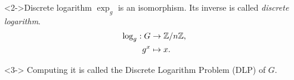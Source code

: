 \documentclass[10pt,usepdftitle=false]{beamer}
\begin{document}
\begin{frame}
\begin{columns}
\begin{column}{0.6\textwidth}
      \begin{block}<2->{Discrete logarithm} $\exp_g$ is an
        isomorphism. Its inverse is called \emph{discrete logarithm}.
        \begin{align*}
          \log_g : G &\rightarrow \mathbb{Z}/n\mathbb{Z}\text{,}\\
          g^x&\mapsto x\text{.}
        \end{align*}

        \begin{uncoverenv}<3-> Computing it is called the
          \alert{Discrete Logarithm Problem} (DLP) of $G$.
        \end{uncoverenv}
      \end{block}
    \end{column}
  \end{columns}
\end{frame}

\end{document}
